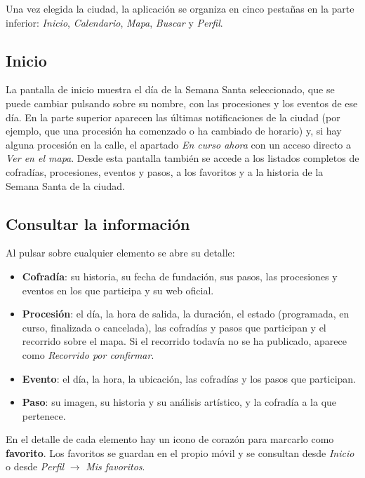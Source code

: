 Una vez elegida la ciudad, la aplicación se organiza en cinco pestañas en la parte inferior: \emph{Inicio}, \emph{Calendario}, \emph{Mapa}, \emph{Buscar} y \emph{Perfil}.

\subsection{Inicio}

La pantalla de inicio muestra el día de la Semana Santa seleccionado, que se puede cambiar pulsando sobre su nombre, con las procesiones y los eventos de ese día. En la parte superior aparecen las últimas notificaciones de la ciudad (por ejemplo, que una procesión ha comenzado o ha cambiado de horario) y, si hay alguna procesión en la calle, el apartado \emph{En curso ahora} con un acceso directo a \emph{Ver en el mapa}. Desde esta pantalla también se accede a los listados completos de cofradías, procesiones, eventos y pasos, a los favoritos y a la historia de la Semana Santa de la ciudad.

\subsection{Consultar la información}

Al pulsar sobre cualquier elemento se abre su detalle:

\begin{itemize}
    \item \textbf{Cofradía}: su historia, su fecha de fundación, sus pasos, las procesiones y eventos en los que participa y su web oficial.
    \item \textbf{Procesión}: el día, la hora de salida, la duración, el estado (programada, en curso, finalizada o cancelada), las cofradías y pasos que participan y el recorrido sobre el mapa. Si el recorrido todavía no se ha publicado, aparece como \emph{Recorrido por confirmar}.
    \item \textbf{Evento}: el día, la hora, la ubicación, las cofradías y los pasos que participan.
    \item \textbf{Paso}: su imagen, su historia y su análisis artístico, y la cofradía a la que pertenece.
\end{itemize}

En el detalle de cada elemento hay un icono de corazón para marcarlo como \textbf{favorito}. Los favoritos se guardan en el propio móvil y se consultan desde \emph{Inicio} o desde \emph{Perfil} $\rightarrow$ \emph{Mis favoritos}.

